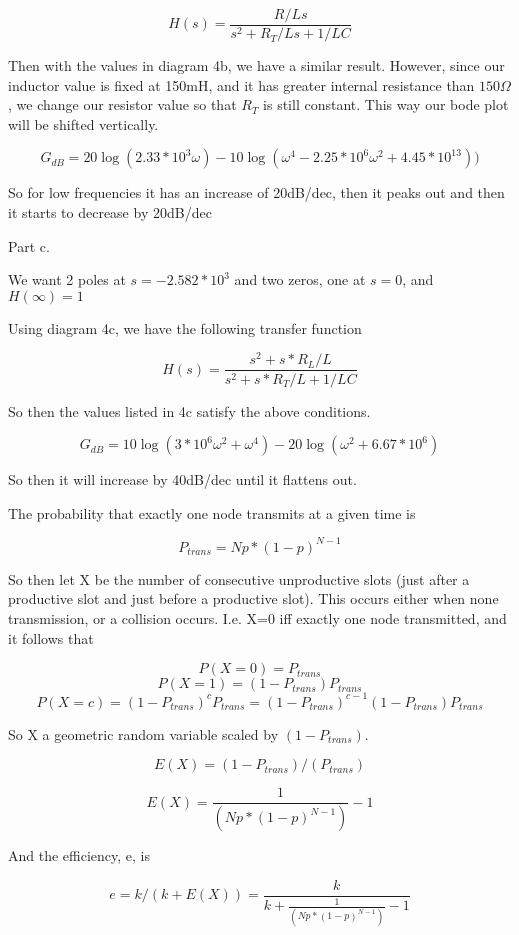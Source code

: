 \documentclass{article}
\begin{document}
$$H(s) = \frac{R/Ls}{s^2+R_T/Ls + 1/LC}$$

Then with the values in diagram 4b, we have a similar result. However, since our inductor value is fixed at 150mH, and it has greater internal resistance than $150\Omega$, we change our resistor value so that $R_T$ is still constant. This way our bode plot will be shifted vertically.

 $$G_{dB} = 20 \log (2.33 *10^3\omega) - 10 \log (\omega^4-2.25*10^6\omega^2+4.45*10^{13}) )$$
 
 So for low frequencies it has an increase of 20dB/dec, then it peaks out and then it starts to decrease by 20dB/dec
 
 Part c.
 
 We want 2 poles at $s = -2.582*10^3$ and two zeros, one  at $s = 0$, and $H(\infty) = 1$
 
 Using diagram 4c, we have the following transfer function
 
 $$H(s) = \frac{s^2+s*R_L/L}{s^2+s*R_T/L+1/LC}$$
 
So then the values listed in 4c satisfy the above conditions. 

 $$G_{dB} = 10 \log (3*10^6\omega^2 +\omega^4) - 20 \log (\omega^2 + 6.67*10^6 )$$

So then it will increase by 40dB/dec until it flattens out.
 



\vspace{10cm}


The probability that exactly one node transmits at a given time is

$$P_{trans} = Np*(1-p)^{N-1}$$

So then let X be the number of consecutive unproductive slots (just after a productive slot and just before a productive slot). This occurs either when none transmission, or a collision occurs. I.e. X=0 iff exactly one node transmitted, and it follows that

$$P(X = 0) = P_{trans}$$
$$P(X = 1) = (1-P_{trans})P_{trans}$$
$$P(X = c) = (1-P_{trans})^{c}P_{trans} =  (1-P_{trans})^{c-1} (1-P_{trans})P_{trans}$$

So X a geometric random variable scaled by $(1-P_{trans}) $.

$$E(X)  = (1-P_{trans}) / (P_{trans}) $$

$$E(X)  = \frac{1}{(Np*(1-p)^{N-1})} - 1 $$

And the efficiency, e, is 

$$e = k/(k+E(X)) = \frac{k}{k+ \frac{1}{(Np*(1-p)^{N-1})} - 1 } $$
\end{document}
